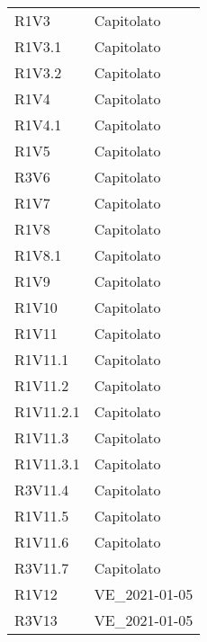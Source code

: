 {\begin{longtable}{C{3cm} C{12.5cm}}
R1V3 & Capitolato \\
R1V3.1 & Capitolato \\
R1V3.2 & Capitolato \\

R1V4 & Capitolato \\
R1V4.1 & Capitolato \\

R1V5 & Capitolato \\

R3V6 & Capitolato \\

R1V7 & Capitolato \\

R1V8 & Capitolato \\
R1V8.1 & Capitolato \\

R1V9 & Capitolato \\

R1V10 & Capitolato \\

R1V11 & Capitolato \\
R1V11.1 & Capitolato \\
R1V11.2 & Capitolato \\
R1V11.2.1 & Capitolato \\
R1V11.3 & Capitolato \\
R1V11.3.1 & Capitolato \\
R3V11.4 & Capitolato \\

R1V11.5 & Capitolato \\
R1V11.6 & Capitolato \\
R3V11.7 & Capitolato \\

R1V12 & VE\_2021-01-05 \\
R3V13 & VE\_2021-01-05 \\

\end{longtable}

}
